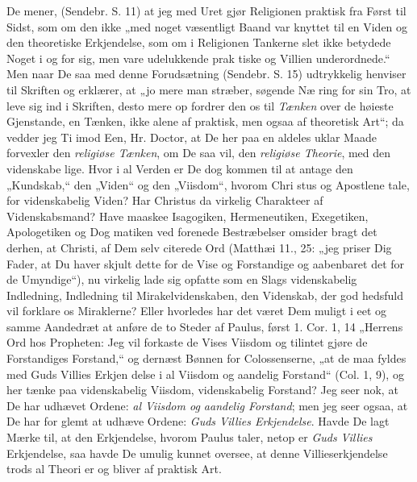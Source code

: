\documentclass[12pt,a4paper]{article}
\newcommand{\opage}[1]{\marginnote{\footnotesize\textit{[#1]}}}
\begin{document}
De mener, (Sendebr. S. 11) at jeg med Uret gjør
\opage{14}\setcounter{footnote}{0}%
Religionen praktisk fra Først til Sidst, som om den ikke „med
noget væsentligt Baand var knyttet til en Viden og den
theoretiske Erkjendelse, som om i Religionen Tankerne slet
ikke betydede Noget i og for sig, men vare udelukkende prak\-%
tiske og Villien underordnede.“ Men naar De saa med denne
Forudsætning (Sendebr. S. 15) udtrykkelig henviser til
Skriften og erklærer, at „jo mere man stræber, søgende Næ\-%
ring for sin Tro, at leve sig ind i Skriften, desto mere op\-%
fordrer den os til \emph{Tænken} over de høieste Gjenstande, en
Tænken, ikke alene af praktisk, men ogsaa af theoretisk Art“;
da vedder jeg Ti imod Een, Hr. Doctor, at De her paa en
aldeles uklar Maade forvexler den \emph{religiøse Tænken}, om
De saa vil, den \emph{religiøse Theorie}, med den videnskabe\-%
lige. Hvor i al Verden er De dog kommen til at antage
den „Kundskab,“ den „Viden“ og den „Viisdom“, hvorom Chri\-%
stus og Apostlene tale, for videnskabelig Viden? Har Christus
da virkelig Charakteer af Videnskabsmand? Have maaskee
Isagogiken, Hermeneutiken, Exegetiken, Apologetiken og Dog\-%
matiken ved forenede Bestræbelser omsider bragt det derhen,
at Christi, af Dem selv citerede Ord (Matthæi 11., 25: „jeg
priser Dig Fader, at Du haver skjult dette for de Vise og
Forstandige og aabenbaret det for de Umyndige“), nu virkelig
lade sig opfatte som en Slags videnskabelig Indledning,
Indledning til Mirakelvidenskaben, den Videnskab, der god\-%
hedsfuld vil forklare os Miraklerne? Eller hvorledes har det
været Dem muligt i eet og samme Aandedræt at anføre de
to Steder af Paulus, først 1. Cor. 1, 14 „Herrens Ord hos
Propheten: Jeg vil forkaste de Vises Viisdom og tilintet\-%
gjøre de Forstandiges Forstand,“ og dernæst Bønnen for
Colossenserne, „at de maa fyldes med Guds Villies Erkjen\-%
delse i al Viisdom og aandelig Forstand“ (Col. 1, 9), og
her tænke paa videnskabelig Viisdom, videnskabelig Forstand?
Jeg seer nok, at De har udhævet Ordene: \emph{al Viisdom og
aandelig Forstand}; men jeg seer ogsaa, at De har for\-%
glemt at udhæve Ordene: \emph{Guds Villies Erkjendelse}.
Havde De lagt Mærke til, at den Erkjendelse, hvorom Paulus
\opage{15}\setcounter{footnote}{0}%
taler, netop er \emph{Guds Villies} Erkjendelse, saa havde De
umulig kunnet oversee, at denne Villieserkjendelse trods al
Theori er og bliver af praktisk Art.
\end{document}
